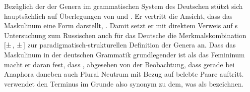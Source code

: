 Bezüglich der  der Genera im grammatischen System des
Deutschen stützt sich \citet{askedal1973} hauptsächlich auf Überlegungen von
\citet{jakobson1932} und \citet{bierwisch1967}.
Er vertritt die Ansicht, dass das Maskulinum eine  Form
darstellt, . Damit setzt
er mit direktem Verweis auf \citeauthor{jakobson1932}s Untersuchung zum
Russischen auch für das Deutsche die Merkmalskombination [±\,\F, ±\,\N] zur
paradigmatisch-strukturellen Definition der Genera an. Dass das Maskulinum in
der deutschen Grammatik grundlegender ist als das Femininum macht er daran
fest, dass , abgesehen von der Beobachtung,
dass gerade bei Anaphora daneben auch Plural Neutrum mit Bezug auf belebte
Paare auftritt. \citet{askedal1973} verwendet den Terminus  im
Grunde also synonym zu dem, was \textcites[205--218]{corbett1991}{wechsler2009}
als  bezeichnen.%
%
%

